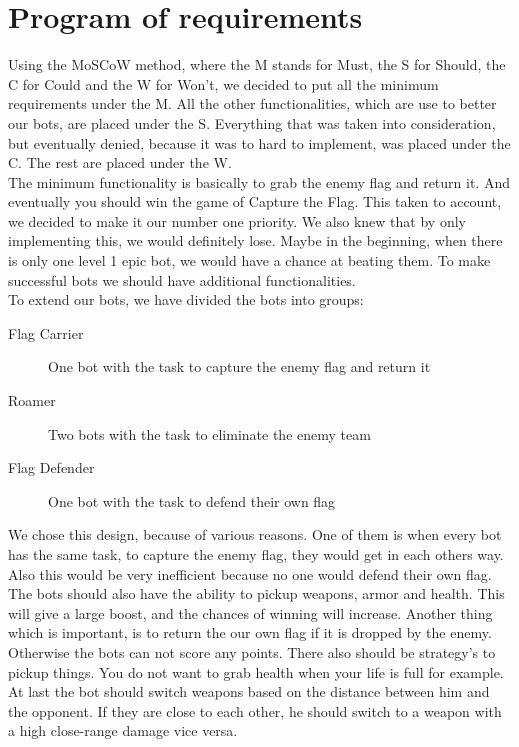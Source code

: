 \chapter{Program of requirements}
Using the MoSCoW method, where the M stands for Must, the S for Should, the C for Could and the W for Won't, we decided to put all the minimum requirements under the M. All the other functionalities, which are use to better our bots, are placed under the S. Everything that was taken into consideration, but eventually denied, because it was to hard to implement, was placed under the C. The rest are placed under the W.\\

The minimum functionality is basically to grab the enemy flag and return it. And eventually you should win the game of Capture the Flag. This taken to account, we decided to make it our number one priority. We also knew that by only implementing this, we would definitely lose. Maybe in the beginning, when there is only one level 1 epic bot, we would have a chance at beating them. To make successful bots we should have additional functionalities.\\ 

To extend our bots, we have divided the bots into groups:
\begin{description}
	\item[Flag Carrier] One bot with the task to capture the enemy flag and return it
	\item[Roamer] Two bots with the task to eliminate the enemy team
	\item[Flag Defender] One bot with the task to defend their own flag 
\end{description}
We chose this design, because of various reasons. One of them is when every bot has the same task, to capture the enemy flag, they would get in each others way. Also this would be very inefficient because no one would defend their own flag. The bots should also have the ability to pickup weapons, armor and health. This will give a large boost, and the chances of winning will increase. Another thing which is important, is to return the our own flag if it is dropped by the enemy. Otherwise the bots can not score any points. There also should be strategy's to pickup things. You do not want to grab health when your life is full for example. At last the bot should switch weapons based on the distance between him and the opponent. If they are close to each other, he should switch to a weapon with a high close-range damage vice versa.\\

